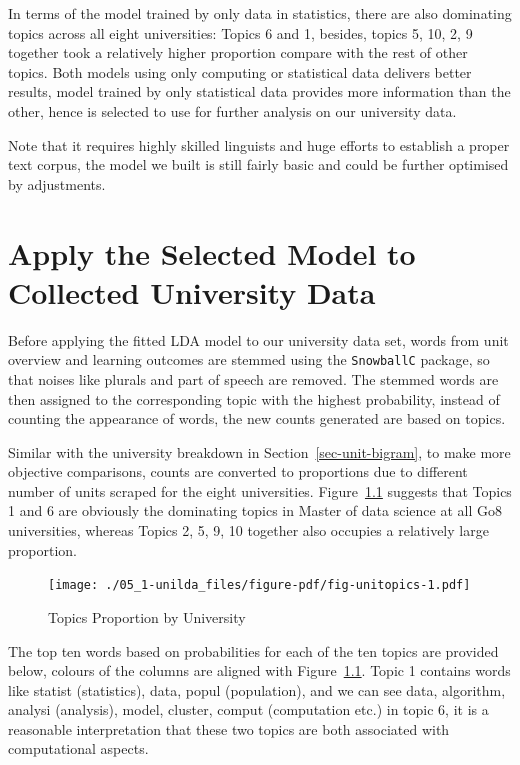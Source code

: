 \documentclass[
  letterpaper,
  DIV=11,
  numbers=noendperiod]{scrreport}
\begin{document}
In terms of the model trained by only data in statistics, there are also
dominating topics across all eight universities: Topics 6 and 1,
besides, topics 5, 10, 2, 9 together took a relatively higher proportion
compare with the rest of other topics. Both models using only computing
or statistical data delivers better results, model trained by only
statistical data provides more information than the other, hence is
selected to use for further analysis on our university data.

Note that it requires highly skilled linguists and huge efforts to
establish a proper text corpus, the model we built is still fairly basic
and could be further optimised by adjustments.

\hypertarget{apply-the-selected-model-to-collected-university-data}{%
\chapter{Apply the Selected Model to Collected University
Data}\label{apply-the-selected-model-to-collected-university-data}}

Before applying the fitted LDA model to our university data set, words
from unit overview and learning outcomes are stemmed using the
\texttt{SnowballC} package, so that noises like plurals and part of
speech are removed. The stemmed words are then assigned to the
corresponding topic with the highest probability, instead of counting
the appearance of words, the new counts generated are based on topics.

Similar with the university breakdown in Section~\ref{sec-unit-bigram},
to make more objective comparisons, counts are converted to proportions
due to different number of units scraped for the eight universities.
Figure~\ref{fig-unitopics} suggests that Topics 1 and 6 are obviously
the dominating topics in Master of data science at all Go8 universities,
whereas Topics 2, 5, 9, 10 together also occupies a relatively large
proportion.

\begin{figure}

{\centering \texttt{[image: ./05\_1-unilda\_files/figure-pdf/fig-unitopics-1.pdf]}

}

\caption{\label{fig-unitopics}Topics Proportion by University}

\end{figure}

The top ten words based on probabilities for each of the ten topics are
provided below, colours of the columns are aligned with
Figure~\ref{fig-unitopics}. Topic 1 contains words like statist
(statistics), data, popul (population), and we can see data, algorithm,
analysi (analysis), model, cluster, comput (computation etc.) in topic
6, it is a reasonable interpretation that these two topics are both
associated with computational aspects.
\end{document}
